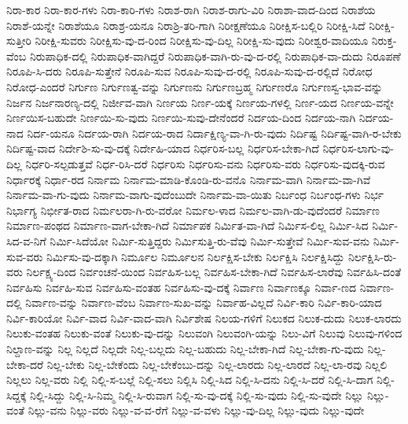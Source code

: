 {ನಿರಾ-ಕಾರ
ನಿರಾ-ಕಾರ-ಗಳು
ನಿರಾ-ಕಾರಿ-ಗಳು
ನಿರಾಶ-ರಾಗಿ
ನಿರಾಶ-ರಾಗು-ವಿರಿ
ನಿರಾಶಾ-ವಾದ-ದಿಂದ
ನಿರಾಶೆಯ
ನಿರಾಶೆ-ಯನ್ನೇ
ನಿರಾಶೆಯೂ
ನಿರಾಶ್ರ-ಯನೂ
ನಿರಾಶ್ರಿ-ತರಿ-ಗಾಗಿ
ನಿರೀಕ್ಷಣೆಯೂ
ನಿರೀಕ್ಷಿಸ-ಬಲ್ಲಿರಿ
ನಿರೀಕ್ಷಿ-ಸಿದೆ
ನಿರೀಕ್ಷಿ-ಸುತ್ತೀರಿ
ನಿರೀಕ್ಷಿ-ಸುವರು
ನಿರೀಕ್ಷಿಸು-ವು-ದ-ರಿಂದ
ನಿರೀಕ್ಷಿಸು-ವು-ದಿಲ್ಲ
ನಿರೀಕ್ಷಿ-ಸು-ವುದು
ನಿರೀಶ್ವರ-ವಾದಿಯೂ
ನಿರುಕ್ತ-ವೆಂಬ
ನಿರುಪಾಧಿಕ-ದಲ್ಲಿ
ನಿರುಪಾಧಿಕ-ವಾಗಿದ್ದರೆ
ನಿರುಪಾಧಿಕ-ವಾಗಿ-ರು-ವು-ದ-ರಲ್ಲಿ
ನಿರುಪಾಧಿಕ-ವಾ-ದುದು
ನಿರೂಪಣೆ
ನಿರೂಪಿ-ಸಿ-ದರು
ನಿರೂಪಿ-ಸುತ್ತೇನೆ
ನಿರೂಪಿ-ಸುವ
ನಿರೂಪಿ-ಸುವು-ದ-ರಲ್ಲಿ
ನಿರೂಪಿ-ಸುವು-ದ-ರಲ್ಲಿದೆ
ನಿರೋಧ
ನಿರೋಧ-ಎಂದರೆ
ನಿರ್ಗುಣ
ನಿರ್ಗುಣತ್ವ-ವನ್ನು
ನಿರ್ಗುಣನು
ನಿರ್ಗುಣಬ್ರಹ್ಮ
ನಿರ್ಗುಣರೊ
ನಿರ್ಗುಣಸ್ವ-ಭಾವ-ವನ್ನು
ನಿರ್ಜನ
ನಿರ್ಜನಾರಣ್ಯ-ದಲ್ಲಿ
ನಿರ್ಜೀವ-ವಾಗಿ
ನಿರ್ಣಯ
ನಿರ್ಣ-ಯಕ್ಕೆ
ನಿರ್ಣಯ-ಗಳಲ್ಲಿ
ನಿರ್ಣ-ಯದ
ನಿರ್ಣಯ-ವನ್ನೇ
ನಿರ್ಣಯಿಸ-ಬಹುದೇ
ನಿರ್ಣಯಿ-ಸು-ವುದು
ನಿರ್ಣಯಿ-ಸುವು-ದೇನೆಂದರೆ
ನಿರ್ದಯ-ದಿಂದ
ನಿರ್ದಯ-ನಾಗಿ
ನಿರ್ದಯ-ನಾದ
ನಿರ್ದ-ಯನೂ
ನಿರ್ದಯ-ರಾಗಿ
ನಿರ್ದಯ-ರಾದ
ನಿರ್ದಾಕ್ಷಿಣ್ಯ-ವಾ-ಗಿ-ರು-ವುದು
ನಿರ್ದಿಷ್ಟ
ನಿರ್ದಿಷ್ಟ-ವಾಗಿ-ರ-ಬೇಕು
ನಿರ್ದಿಷ್ಟ-ವಾದ
ನಿರ್ದೇಶಿ-ಸು-ವು-ದಕ್ಕೆ
ನಿರ್ದೇಹಿ-ಯಾದ
ನಿರ್ಧರಿಸ-ಬಲ್ಲ
ನಿರ್ಧರಿಸ-ಬೇಕಾ-ಗಿದೆ
ನಿರ್ಧರಿಸ-ಲಾಗು-ವು-ದಿಲ್ಲ
ನಿರ್ಧರಿ-ಸಲ್ಪಡುತ್ತವೆ
ನಿರ್ಧ-ರಿಸಿ-ದರೆ
ನಿರ್ಧರಿಸು
ನಿರ್ಧರಿಸು-ವನು
ನಿರ್ಧರಿಸು-ವರು
ನಿರ್ಧರಿಸು-ವುದಕ್ಕಿ-ರುವ
ನಿರ್ಧಾರಕ್ಕೆ
ನಿರ್ಧಾ-ರದ
ನಿರ್ನಾಮ
ನಿರ್ನಾಮ-ಮಾಡಿ-ಕೊಂಡಿ-ರು-ವನೊ
ನಿರ್ನಾಮ-ವಾಗಿ
ನಿರ್ನಾಮ-ವಾ-ಗಿವೆ
ನಿರ್ನಾಮ-ವಾ-ಗು-ವುದು
ನಿರ್ನಾಮ-ವಾಗು-ವುದೆಂಬುದೇ
ನಿರ್ನಾಮ-ವಾ-ಯಿತು
ನಿರ್ಬಂಧ
ನಿರ್ಬಂಧ-ಗಳು
ನಿರ್ಭ
ನಿರ್ಭಾಗ್ಯ
ನಿರ್ಭೀತ-ರಾದ
ನಿರ್ಮಲರಾ-ಗಿ-ರು-ವರೋ
ನಿರ್ಮಲ-ಳಾದ
ನಿರ್ಮಲ-ವಾಗಿ-ಡು-ವುದೆಂದರೆ
ನಿರ್ಮಾಣ
ನಿರ್ಮಾಣ-ಪಂಥದ
ನಿರ್ಮಾಣ-ವಾಗ-ಬೇಕಾ-ಗಿದೆ
ನಿರ್ಮಾಪಕ
ನಿರ್ಮಿತ-ವಾ-ಗಿದೆ
ನಿರ್ಮಿಸ-ಲಿಲ್ಲ
ನಿರ್ಮಿ-ಸಿದ
ನಿರ್ಮಿ-ಸಿದ-ವ-ನಿಗೆ
ನಿರ್ಮಿ-ಸಿದೆಯೋ
ನಿರ್ಮಿ-ಸುತ್ತಿದ್ದರು
ನಿರ್ಮಿಸುತ್ತಿ-ರು-ವೆವು
ನಿರ್ಮಿ-ಸುತ್ತೇವೆ
ನಿರ್ಮಿ-ಸುವ-ವನು
ನಿರ್ಮಿ-ಸುವ-ವರು
ನಿರ್ಮಿಸು-ವು-ದಕ್ಕಾಗಿ
ನಿರ್ಮೂಲ
ನಿರ್ಮೂಲನ
ನಿರ್ಲಕ್ಷಿಸ-ಬೇಕು
ನಿರ್ಲಕ್ಷಿಸಿ
ನಿರ್ಲಕ್ಷಿಸಿದ್ದು
ನಿರ್ಲಕ್ಷಿಸಿ-ರು-ವರು
ನಿರ್ಲಕ್ಷ್ಯ-ದಿಂದ
ನಿರ್ವಂಚನೆ-ಯಿಂದ
ನಿರ್ವಹಿಸ-ಬಲ್ಲ
ನಿರ್ವಹಿಸ-ಬೇಕಾ-ಗಿದೆ
ನಿರ್ವಹಿಸ-ಲಾರೆವು
ನಿರ್ವಹಿಸಿ-ದಂತೆ
ನಿರ್ವಹಿಸು
ನಿರ್ವಹಿ-ಸುವ
ನಿರ್ವಹಿಸು-ವಂತಹ
ನಿರ್ವಹಿಸು-ವು-ದಕ್ಕೆ
ನಿರ್ವಾಣ
ನಿರ್ವಾಣಕ್ಕೂ
ನಿರ್ವಾ-ಣದ
ನಿರ್ವಾಣ-ದಲ್ಲಿ
ನಿರ್ವಾಣ-ವನ್ನು
ನಿರ್ವಾಣ-ವೆಂಬ
ನಿರ್ವಾಣ-ಸುಖ-ವನ್ನು
ನಿರ್ವಾಹ-ವಿಲ್ಲದೆ
ನಿರ್ವಿ-ಕಾರಿ
ನಿರ್ವಿ-ಕಾರಿ-ಯಾದ
ನಿರ್ವಿ-ಕಾರಿಯೋ
ನಿರ್ವಿ-ವಾದ
ನಿರ್ವಿ-ವಾದ-ವಾಗಿ
ನಿರ್ವಿಶೇಷ
ನಿಲಯ-ಗಳಿಗೆ
ನಿಲುಕದ
ನಿಲುಕ-ದುದು
ನಿಲುಕ-ಲಾರದು
ನಿಲುಕು-ವಂತಹ
ನಿಲುಕು-ವಂತೆ
ನಿಲುಕು-ವು-ದನ್ನು
ನಿಲುವಂಗಿ
ನಿಲುವಂಗಿ-ಯನ್ನು
ನಿಲು-ವಿಗೆ
ನಿಲುವು
ನಿಲುವು-ಗಳಿಂದ
ನಿಲ್ದಾಣ-ವನ್ನು
ನಿಲ್ಲ
ನಿಲ್ಲದೆ
ನಿಲ್ಲದೇ
ನಿಲ್ಲ-ಬಲ್ಲದು
ನಿಲ್ಲ-ಬಹುದು
ನಿಲ್ಲ-ಬೇಕಾ-ಗಿದೆ
ನಿಲ್ಲ-ಬೇಕಾ-ಗು-ವುದು
ನಿಲ್ಲ-ಬೇಕಾ-ದರೆ
ನಿಲ್ಲ-ಬೇಕು
ನಿಲ್ಲ-ಬೇಕೆಂದು
ನಿಲ್ಲ-ಬೇಕೆಂಬು-ದನ್ನು
ನಿಲ್ಲ-ಲಾರದು
ನಿಲ್ಲ-ಲಾರದೆ
ನಿಲ್ಲ-ಲಾ-ರವು
ನಿಲ್ಲಲಿ
ನಿಲ್ಲಲು
ನಿಲ್ಲ-ವರು
ನಿಲ್ಲಿ
ನಿಲ್ಲಿ-ಸ-ಬಲ್ಲೆ
ನಿಲ್ಲಿ-ಸಲು
ನಿಲ್ಲಿಸಿ
ನಿಲ್ಲಿ-ಸಿದ
ನಿಲ್ಲಿ-ಸಿ-ದನು
ನಿಲ್ಲಿ-ಸಿ-ದರೆ
ನಿಲ್ಲಿ-ಸಿ-ದಾಗ
ನಿಲ್ಲಿ-ಸಿದ್ದಕ್ಕೆ
ನಿಲ್ಲಿ-ಸಿದ್ದು
ನಿಲ್ಲಿ-ಸಿ-ನಿಮ್ಮ
ನಿಲ್ಲಿ-ಸಿ-ರುವಾಗ
ನಿಲ್ಲಿ-ಸು-ವು-ದಕ್ಕೆ
ನಿಲ್ಲಿ-ಸು-ವುದು
ನಿಲ್ಲಿ-ಸು-ವುದೇ
ನಿಲ್ಲು
ನಿಲ್ಲು-ವಂತೆ
ನಿಲ್ಲು-ವನು
ನಿಲ್ಲು-ವರು
ನಿಲ್ಲು-ವ-ವ-ರೆಗೆ
ನಿಲ್ಲು-ವ-ವಳು
ನಿಲ್ಲು-ವು-ದಿಲ್ಲ
ನಿಲ್ಲು-ವುದು
ನಿಲ್ಲು-ವುದೇ
}
